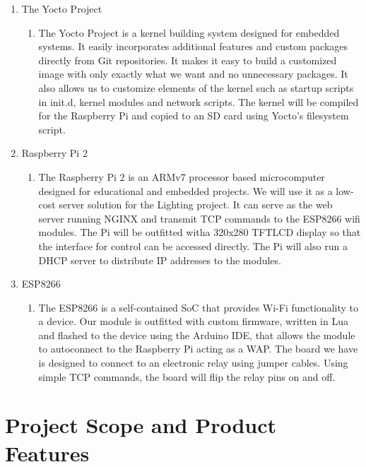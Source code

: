 \documentclass[oneside,openright]{book}
\begin{document}
\begin{enumerate}
    \item The Yocto Project 
    \begin{enumerate}
        \item The Yocto Project is a kernel building system designed for
            embedded systems. It easily incorporates additional features and
            custom packages directly from Git repositories. It makes it easy to
            build a customized image with only exactly what we want and no
            unnecessary packages. It also allows us to customize elements of
            the kernel such as startup scripts in init.d, kernel modules and
            network scripts. The kernel will be compiled for the Raspberry Pi
            and copied to an SD card using Yocto's filesystem script.
    \end{enumerate} 
        \item Raspberry Pi 2
    \begin{enumerate}
        \item The Raspberry Pi 2 is an ARMv7 processor based microcomputer
            designed for educational and embedded projects. We will use it as a
            low-cost server solution for the Lighting project. It can serve as
            the web server running NGINX and transmit TCP commands to the
            ESP8266 wifi modules. The Pi will be outfitted witha 320x280 TFTLCD
            display so that the interface for control can be accessed directly.
            The Pi will also run a DHCP server to distribute IP addresses to
            the modules.
    \end{enumerate} 
        \item ESP8266
    \begin{enumerate}
        \item The ESP8266 is a self-contained SoC that provides Wi-Fi
            functionality to a device. Our module is outfitted with custom
            firmware, written in Lua and flashed to the device using the
            Arduino IDE, that allows the module to autoconnect to the Raspberry
            Pi acting as a WAP. The board we have is designed to connect to an
            electronic relay using jumper cables. Using simple TCP commands,
            the board will flip the relay pins on and off.
    \end{enumerate}
\end{enumerate}

\section{Project Scope and Product Features}
\end{document}
